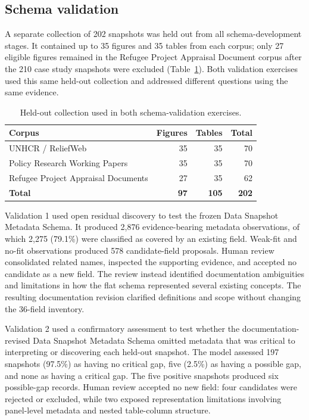 \documentclass{article}
\begin{document}
\subsection{Schema validation}
\label{sec:schema_validation_case_study}

A separate collection of 202 snapshots was held out from all schema-development stages. It contained up to 35 figures and 35 tables from each corpus; only 27 eligible figures remained in the Refugee Project Appraisal Document corpus after the 210 case study snapshots were excluded (Table~\ref{tab:validation_composition}). Both validation exercises used this same held-out collection and addressed different questions using the same evidence.

\begin{table}[!ht]
    \centering
    \caption{Held-out collection used in both schema-validation exercises.}
    \label{tab:validation_composition}
    \begin{tabular}{lrrr}
        \toprule
        \textbf{Corpus} & \textbf{Figures} & \textbf{Tables} & \textbf{Total} \\
        \midrule
        UNHCR / ReliefWeb & 35 & 35 & 70 \\
        Policy Research Working Papers & 35 & 35 & 70 \\
        Refugee Project Appraisal Documents & 27 & 35 & 62 \\
        \midrule
        \textbf{Total} & \textbf{97} & \textbf{105} & \textbf{202} \\
        \bottomrule
    \end{tabular}
\end{table}

Validation 1 used open residual discovery to test the frozen Data Snapshot Metadata Schema. It produced 2,876 evidence-bearing metadata observations, of which 2,275 (79.1\%) were classified as covered by an existing field. Weak-fit and no-fit observations produced 578 candidate-field proposals. Human review consolidated related names, inspected the supporting evidence, and accepted no candidate as a new field. The review instead identified documentation ambiguities and limitations in how the flat schema represented several existing concepts. The resulting documentation revision clarified definitions and scope without changing the 36-field inventory.

Validation 2 used a confirmatory assessment to test whether the documentation-revised Data Snapshot Metadata Schema omitted metadata that was critical to interpreting or discovering each held-out snapshot. The model assessed 197 snapshots (97.5\%) as having no critical gap, five (2.5\%) as having a possible gap, and none as having a critical gap. The five positive snapshots produced six possible-gap records. Human review accepted no new field: four candidates were rejected or excluded, while two exposed representation limitations involving panel-level metadata and nested table-column structure.
\end{document}
